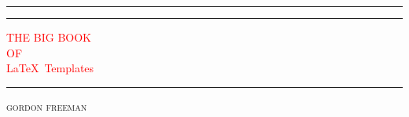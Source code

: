 %
%
%
% 


\centering %


\rule{\textwidth}{1pt} %

\vspace{2pt}\vspace{-\baselineskip} %

\rule{\textwidth}{0.4pt} %

\vspace{0.1\textheight} %


\textcolor{red}{ %
	{\Huge THE BIG BOOK}\\[0.5\baselineskip] %
	{\Large OF}\\[0.5\baselineskip] %
	{\Huge \LaTeX~Templates} %
}

\vspace{0.025\textheight} %

\rule{0.3\textwidth}{0.4pt} %

\vspace{0.1\textheight} %


{\Large \textsc{gordon freeman}} %

\vfill %


